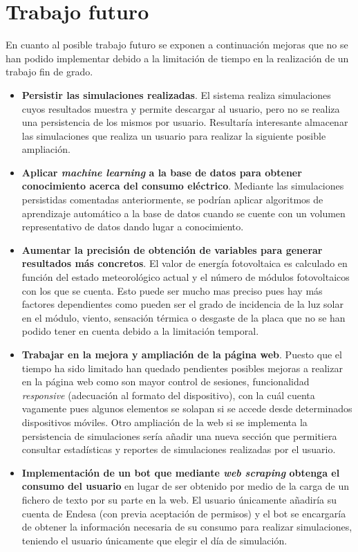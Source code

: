 \section{Trabajo futuro}
En cuanto al posible trabajo futuro se exponen a continuación mejoras que no se han podido implementar debido a la limitación de tiempo en la realización de un trabajo fin de grado.
\begin{itemize}
\item \textbf{Persistir las simulaciones realizadas}. El sistema realiza simulaciones cuyos resultados muestra y permite descargar al usuario, pero no se realiza una persistencia de los mismos por usuario. Resultaría interesante almacenar las simulaciones que realiza un usuario para realizar la siguiente posible ampliación.
\item \textbf{Aplicar \textit{machine learning} a la base de datos para obtener conocimiento acerca del consumo eléctrico}. Mediante las simulaciones persistidas comentadas anteriormente, se podrían aplicar algoritmos de aprendizaje automático a la base de datos cuando se cuente con un volumen representativo de datos dando lugar a conocimiento.
\item \textbf{Aumentar la precisión de obtención de variables para generar resultados más concretos}. El valor de energía fotovoltaica es calculado en función del estado meteorológico actual y el número de módulos fotovoltaicos con los que se cuenta. Esto puede ser mucho mas preciso pues hay más factores dependientes como pueden ser el grado de incidencia de la luz solar en el módulo, viento, sensación térmica o desgaste de la placa que no se han podido tener en cuenta debido a la limitación temporal.
\item \textbf{Trabajar en la mejora y ampliación de la página web}. Puesto que el tiempo ha sido limitado han quedado pendientes posibles mejoras a realizar en la página web como son mayor control de sesiones, funcionalidad \textit{responsive} (adecuación al formato del dispositivo), con la cuál cuenta vagamente pues algunos elementos se solapan si se accede desde determinados dispositivos móviles. Otro ampliación de la web si se implementa la persistencia de simulaciones sería añadir una nueva sección que permitiera consultar estadísticas y reportes de simulaciones realizadas por el usuario.
\item \textbf{Implementación de un bot que mediante \textit{web scraping} obtenga el consumo del usuario} en lugar de ser obtenido por medio de la carga de un fichero de texto por su parte en la web. El usuario únicamente añadiría su cuenta de Endesa (con previa aceptación de permisos) y el bot se encargaría de obtener la información necesaria de su consumo para realizar simulaciones, teniendo el usuario únicamente que elegir el día de simulación.
\end{itemize}
